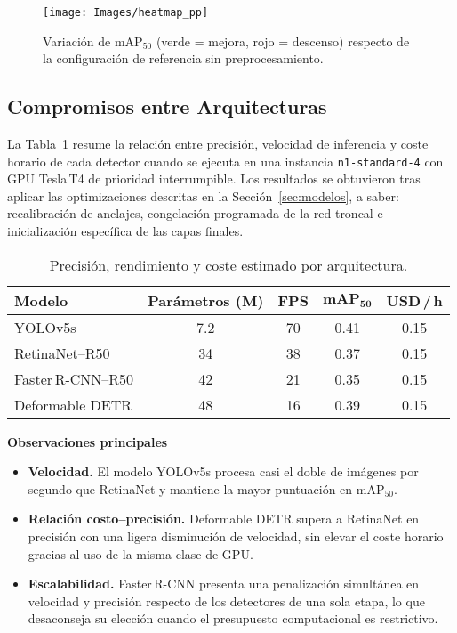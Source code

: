 \begin{figure}[!h]
  \centering
  \texttt{[image: Images/heatmap\_pp]}
  \caption{Variación de \(\text{mAP}_{50}\) (verde = mejora, rojo = descenso) respecto de la configuración de referencia sin preprocesamiento.}
  \label{fig:heatmap_pp}
\end{figure}

\subsection{Compromisos entre Arquitecturas}\label{ssec:tradeoffs}

La Tabla~\ref{tab:tradeoff} resume la relación entre precisión, velocidad de inferencia y coste horario de cada detector cuando se ejecuta en una instancia \texttt{n1-standard-4} con GPU Tesla\,T4 de prioridad interrumpible.
Los resultados se obtuvieron tras aplicar las optimizaciones descritas en la Sección~\ref{sec:modelos}, a saber: recalibración de anclajes, congelación programada de la red troncal e inicialización específica de las capas finales.

\begin{table}[!h]
  \centering
  \caption{Precisión, rendimiento y coste estimado por arquitectura.}
  \label{tab:tradeoff}
  \begin{tabular}{|l|c|c|c|c|}
    \hline
    \textbf{Modelo} & \textbf{Parámetros (M)} & \textbf{FPS\footnotemark} & \(\mathbf{mAP_{50}}\) & \textbf{USD\,/\,h\footnotemark} \\ \hline
    YOLOv5s          & 7.2  & 70 & 0.41 & 0.15 \\ \hline
    RetinaNet–R50    & 34   & 38 & 0.37 & 0.15 \\ \hline
    Faster\,R-CNN–R50 & 42   & 21 & 0.35 & 0.15 \\ \hline
    Deformable DETR  & 48   & 16 & 0.39 & 0.15 \\ \hline
  \end{tabular}
\end{table}


\textbf{Observaciones principales}
\begin{itemize}
  \item \textbf{Velocidad.}
        El modelo YOLOv5s procesa casi el doble de imágenes por segundo que RetinaNet y mantiene la mayor puntuación en \(\text{mAP}_{50}\).
  \item \textbf{Relación costo–precisión.}
        Deformable DETR supera a RetinaNet en precisión con una ligera disminución de velocidad, sin elevar el coste horario gracias al uso de la misma clase de GPU.
  \item \textbf{Escalabilidad.}
        Faster\,R-CNN presenta una penalización simultánea en velocidad y precisión respecto de los detectores de una sola etapa, lo que desaconseja su elección cuando el presupuesto computacional es restrictivo.
\end{itemize}

